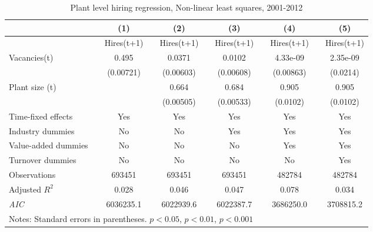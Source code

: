 \begin{table}[htbp]
\caption{\label{tab:main_nls} Plant level hiring regression, Non-linear least squares,  2001-2012 }
\begin{tabularx} {\textwidth} { l X cXcXcXcXc}
\hline
       &&   (1) &&     (2) &&    (3)       &&   (4)        &&   (5)      \\
\hline
        &&   \footnotesize{ Hires(t+1)} &&     \footnotesize{ Hires(t+1)} &&    \footnotesize{ Hires(t+1)}      &&  \footnotesize{ Hires(t+1)}       &&    \footnotesize{ Hires(t+1)}     \\
\hline
\footnotesize{Vacancies(t)}        &&     0.495\sym{***}&&      0.0371\sym{***}&&      0.0102         &&    4.33e-09         &&    2.35e-09       \\
                    &&   (0.00721)         &&   (0.00603)         &&   (0.00608)         &&   (0.00863)         &&   (0.0214)           \\
\footnotesize{Plant size (t) }     &&                     &&       0.664\sym{***} &&       0.684\sym{***} &&       0.905\sym{***} &&       0.905\sym{***}\\
                    &&                     &&   (0.00505)         &&   (0.00533)         &&    (0.0102)         &&    (0.0102)         \\
\hline
\footnotesize{Time-fixed effects}  && Yes                 && Yes                     &&           Yes          &&    Yes        &&    Yes      \\
\footnotesize{Industry dummies  }  && No                  && No                      &&     Yes                 &&    Yes        &&   Yes      \\
\footnotesize{Value-added dummies} && No                  && No                      &&     No                 &&    Yes        &&    Yes      \\
\footnotesize{Turnover dummies  }  && No                  && No                      &&     No                 &&    No        &&    Yes      \\
\hline
Observations        &&      693451         &&      693451         &&      693451         &&      482784         &&      482784         \\
Adjusted \(R^{2}\)  &&       0.028         &&       0.046         &&       0.047         &&       0.078         &&        0.034         \\
\textit{AIC}        &&   6036235.1         &&   6022939.6         &&   6022387.7         &&   3686250.0         &&   3708815.2         \\
\hline\hline
\multicolumn{11}{l}{\footnotesize Notes: Standard errors in parentheses. \sym{*} \(p<0.05\), \sym{**} \(p<0.01\), \sym{***} \(p<0.001\) }\\
\end{tabularx}
\end{table}


